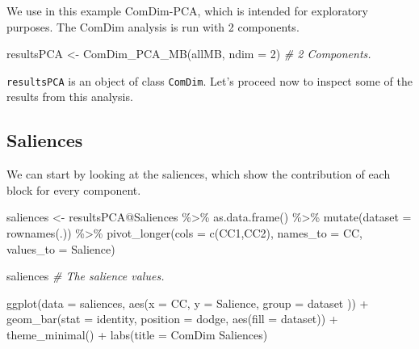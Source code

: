 \documentclass[
]{book}
\newenvironment{Shaded}{\begin{snugshade}}{\end{snugshade}}
\newcommand{\AttributeTok}[1]{\textcolor[rgb]{0.77,0.63,0.00}{#1}}
\newcommand{\CommentTok}[1]{\textcolor[rgb]{0.56,0.35,0.01}{\textit{#1}}}
\newcommand{\DecValTok}[1]{\textcolor[rgb]{0.00,0.00,0.81}{#1}}
\newcommand{\FunctionTok}[1]{\textcolor[rgb]{0.00,0.00,0.00}{#1}}
\newcommand{\NormalTok}[1]{#1}
\newcommand{\OtherTok}[1]{\textcolor[rgb]{0.56,0.35,0.01}{#1}}
\newcommand{\SpecialCharTok}[1]{\textcolor[rgb]{0.00,0.00,0.00}{#1}}
\newcommand{\StringTok}[1]{\textcolor[rgb]{0.31,0.60,0.02}{#1}}
\begin{document}
We use in this example ComDim-PCA, which is intended for exploratory purposes.
The ComDim analysis is run with 2 components.

\begin{Shaded}
\begin{Highlighting}[]
\NormalTok{resultsPCA }\OtherTok{\textless{}{-}} \FunctionTok{ComDim\_PCA\_MB}\NormalTok{(allMB, }\AttributeTok{ndim =} \DecValTok{2}\NormalTok{) }\CommentTok{\# 2 Components.}
\end{Highlighting}
\end{Shaded}

\texttt{resultsPCA} is an object of class \texttt{ComDim}.
Let's proceed now to inspect some of the results from this analysis.

\hypertarget{saliences}{%
\subsection{Saliences}\label{saliences}}

We can start by looking at the saliences, which show the contribution of each
block for every component.

\begin{Shaded}
\begin{Highlighting}[]
\NormalTok{saliences }\OtherTok{\textless{}{-}}\NormalTok{ resultsPCA}\SpecialCharTok{@}\NormalTok{Saliences }\SpecialCharTok{\%\textgreater{}\%}
  \FunctionTok{as.data.frame}\NormalTok{() }\SpecialCharTok{\%\textgreater{}\%}
  \FunctionTok{mutate}\NormalTok{(}\AttributeTok{dataset =} \FunctionTok{rownames}\NormalTok{(.)) }\SpecialCharTok{\%\textgreater{}\%}
  \FunctionTok{pivot\_longer}\NormalTok{(}\AttributeTok{cols =} \FunctionTok{c}\NormalTok{(}\StringTok{\textquotesingle{}CC1\textquotesingle{}}\NormalTok{,}\StringTok{\textquotesingle{}CC2\textquotesingle{}}\NormalTok{),}
               \AttributeTok{names\_to =} \StringTok{\textquotesingle{}CC\textquotesingle{}}\NormalTok{,}
               \AttributeTok{values\_to =} \StringTok{\textquotesingle{}Salience\textquotesingle{}}\NormalTok{)}

\NormalTok{saliences }\CommentTok{\# The salience values.}

\FunctionTok{ggplot}\NormalTok{(}\AttributeTok{data =}\NormalTok{ saliences,}
       \FunctionTok{aes}\NormalTok{(}\AttributeTok{x =}\NormalTok{ CC, }\AttributeTok{y =}\NormalTok{ Salience, }\AttributeTok{group =}\NormalTok{ dataset )) }\SpecialCharTok{+}
  \FunctionTok{geom\_bar}\NormalTok{(}\AttributeTok{stat =} \StringTok{\textquotesingle{}identity\textquotesingle{}}\NormalTok{, }\AttributeTok{position =} \StringTok{\textquotesingle{}dodge\textquotesingle{}}\NormalTok{,}
           \FunctionTok{aes}\NormalTok{(}\AttributeTok{fill =}\NormalTok{ dataset)) }\SpecialCharTok{+}
  \FunctionTok{theme\_minimal}\NormalTok{() }\SpecialCharTok{+}
  \FunctionTok{labs}\NormalTok{(}\AttributeTok{title =} \StringTok{\textquotesingle{}ComDim Saliences\textquotesingle{}}\NormalTok{)}
\end{Highlighting}
\end{Shaded}
\end{document}
